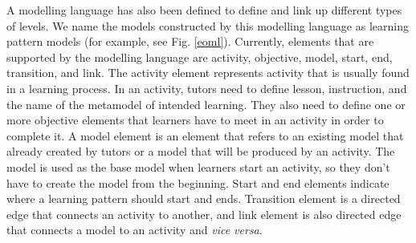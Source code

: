 \documentclass[conference]{IEEEtran}
\begin{document}
A modelling language has also been defined to define and link up different types of levels. We name the models constructed by this modelling language as learning pattern models (for example, see Fig. \ref{eoml}). Currently, elements that are supported by the modelling language are activity, objective, model, start, end, transition, and link. The activity element represents activity that is usually found in a learning process. In an activity, tutors need to define lesson, instruction, and the name of the metamodel of intended learning. They also need to define one or more objective elements that learners have to meet in an activity in order to complete it. A model element is an element that refers to an existing model that already created by tutors or a model that will be produced by an activity. The model is used as the base model when learners start an activity, so they don't have to create the model from the beginning. Start and end elements indicate where a learning pattern should start and ends. Transition element is a directed edge that connects an activity to another, and link element is also directed edge that connects a model to an activity and \textit{vice versa}.

\end{document}
